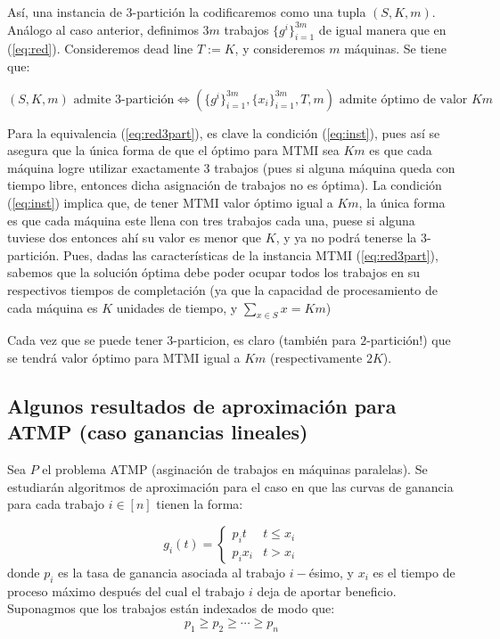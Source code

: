 \documentclass[10pt]{article}
\theoremstyle{plain}
\theoremstyle{definition}
\begin{document}
Así, una instancia de $3$-partición la codificaremos como una tupla $(S, K, m)$. Análogo al caso anterior, definimos $3m$ trabajos $\{g^i\}_{i=1}^{3m}$ de igual manera que en (\ref{eq:red}). Consideremos dead line $T:=K$, y consideremos $m$ máquinas. Se tiene que:

\begin{equation}
\label{eq:red3part}
(S, K, m) \text{ admite $3$-partición} \Longleftrightarrow (\{g^i\}_{i=1}^{3m}, \{x_i\}_{i=1}^{3m}, T, m)
\text{ admite óptimo de valor $Km$}
\end{equation}

Para la equivalencia (\ref{eq:red3part}), es clave la condición  (\ref{eq:inst}), pues así se asegura que la única forma de que el óptimo para MTMI sea $Km$ es que cada máquina logre utilizar exactamente 3 trabajos (pues si alguna máquina queda con tiempo libre, entonces dicha asignación de trabajos no es óptima). La condición (\ref{eq:inst}) implica que, de tener MTMI valor óptimo igual a $Km$, la única forma es que cada máquina este llena con tres trabajos cada una, puese si alguna tuviese dos entonces ahí su valor es menor que $K$, y ya no podrá tenerse la 3-partición. Pues, dadas las características de la instancia MTMI (\ref{eq:red3part}), sabemos que la solución óptima debe poder ocupar todos los trabajos en su respectivos tiempos de completación (ya que la capacidad de procesamiento de cada máquina es $K$ unidades de tiempo, y $\sum_{x \in S} x = Km$)

Cada vez que se puede tener 3-particion, es claro (también para $2$-partición!) que se tendrá valor óptimo para MTMI igual a $Km$ (respectivamente $2K$).

\subsection{Algunos resultados de aproximación para ATMP (caso ganancias lineales)}

Sea $P$ el problema ATMP (asginaci\'on de trabajos en m\'aquinas paralelas). Se estudiar\'an algoritmos de aproximaci\'on para el caso en que las curvas de ganancia para cada trabajo $i \in [n]$ tienen la forma:


$$
g_i(t) = \left\{\begin{array}{lr}
p_i t & t \leq x_i \\
p_i x_i & t>x_i
\end{array}\right.
$$
donde $p_i$ es la tasa de ganancia asociada al trabajo $i-$\'esimo, y $x_i$ es el tiempo de proceso m\'aximo despu\'es del cual el trabajo $i$ deja de aportar beneficio. Suponagmos que los trabajos est\'an indexados de modo que:
\begin{equation}
\label{eq:trabajosOrd}
p_1 \geq p_2 \geq \cdots \geq p_n
\end{equation}
\end{document}
